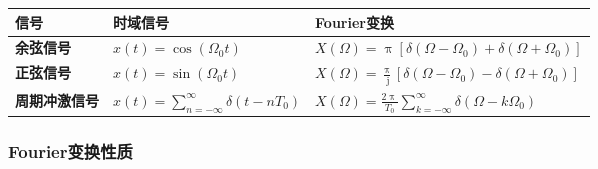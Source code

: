 \documentclass[UTF8,fontset=fandol,zihao=5]{ctexart}
\newcommand{\jj}{\,\mathrm{j}}
\begin{document}
\begin{enumerate}
    \begin{center}
    \begin{tabularx}{0.98\textwidth}{>{\bfseries}p{2.3cm}X X}
    \toprule
    信号 & 时域信号 & Fourier变换 \\
    \midrule

    余弦信号
    &
    $\displaystyle
    x(t)=\cos(\varOmega_0 t)
    $
    &
    $\displaystyle
    X(\varOmega)
    =
    \uppi
    \left[
    \delta(\varOmega-\varOmega_0)
    +
    \delta(\varOmega+\varOmega_0)
    \right]
    $
    \\

    正弦信号
    &
    $\displaystyle
    x(t)=\sin(\varOmega_0 t)
    $
    &
    $\displaystyle
    X(\varOmega)
    =
    \frac{\uppi}{\jj}
    \left[
    \delta(\varOmega-\varOmega_0)
    -
    \delta(\varOmega+\varOmega_0)
    \right]
    $
    \\

    周期冲激信号
    &
    $\displaystyle
    x(t)
    =
    \sum_{n=-\infty}^{\infty}
    \delta(t-nT_0)
    $
    &
    $\displaystyle
    X(\varOmega)
    =
    \frac{2\uppi}{T_0}
    \sum_{k=-\infty}^{\infty}
    \delta(\varOmega-k\varOmega_0)
    $
    \\

    \bottomrule
    \end{tabularx}
    \end{center}
  \end{enumerate}

\subsubsection{Fourier变换性质}
\end{document}
